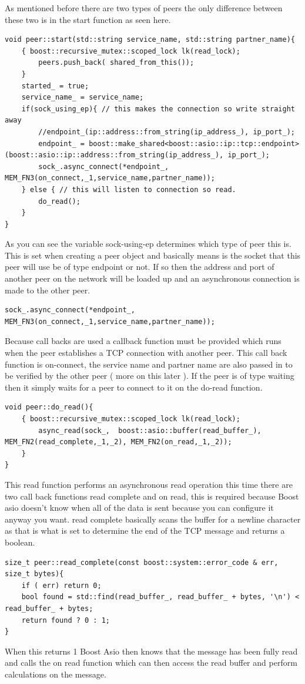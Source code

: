 As mentioned before there are two types of peers the only difference between these two is in the start function as seen here.
\begin{lstlisting}
void peer::start(std::string service_name, std::string partner_name){
	{ boost::recursive_mutex::scoped_lock lk(read_lock);
		peers.push_back( shared_from_this());
	}
	started_ = true;
	service_name_ = service_name;
	if(sock_using_ep){ // this makes the connection so write straight away
		//endpoint_(ip::address::from_string(ip_address_), ip_port_);
		endpoint_ = boost::make_shared<boost::asio::ip::tcp::endpoint>(boost::asio::ip::address::from_string(ip_address_), ip_port_);
		sock_.async_connect(*endpoint_, MEM_FN3(on_connect,_1,service_name,partner_name));
	} else { // this will listen to connection so read.
		do_read();
	}
}
\end{lstlisting}
As you can see the variable sock-using-ep determines which type of peer this is. This is set when creating a peer object and basically means is the socket that this peer will use be of type endpoint or not. If so then the address and port of another peer on the network will be loaded up and an asynchronous connection is made to the other peer.
\begin{lstlisting}
sock_.async_connect(*endpoint_, MEM_FN3(on_connect,_1,service_name,partner_name));
\end{lstlisting}
Because call backs are used a callback function must be provided which runs when the peer establishes a TCP connection with another peer. This call back function is on-connect, the service name and partner name are also passed in to be verified by the other peer ( more on this later ). 
If the peer is of type waiting then it simply waits for a peer to connect to it on the do-read function.
\begin{lstlisting}
void peer::do_read(){
	{ boost::recursive_mutex::scoped_lock lk(read_lock);
		async_read(sock_,  boost::asio::buffer(read_buffer_), MEM_FN2(read_complete,_1,_2), MEM_FN2(on_read,_1,_2));
	}
}
\end{lstlisting}
This read function performs an asynchronous read operation this time there are two call back functions read complete and on read, this is required because Boost asio doesn't know when all of the data is sent because you can configure it anyway you want. read complete basically scans the buffer for a newline character as that is what is set to determine the end of the TCP message and returns a boolean.
\begin{lstlisting}
size_t peer::read_complete(const boost::system::error_code & err, size_t bytes){
	if ( err) return 0;
	bool found = std::find(read_buffer_, read_buffer_ + bytes, '\n') < read_buffer_ + bytes;
	return found ? 0 : 1;
}
\end{lstlisting}
When this returns 1 Boost Asio then knows that the message has been fully read and calls the on read function which can then access the read buffer and perform calculations on the message.

